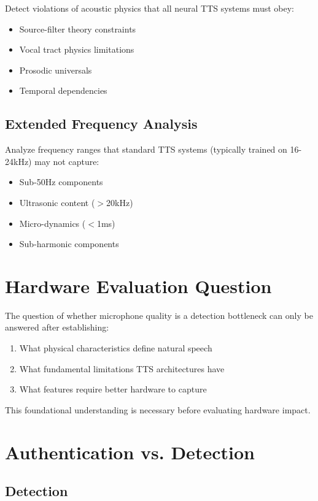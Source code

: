 \documentclass{article}
\begin{document}
Detect violations of acoustic physics that all neural TTS systems must obey:
\begin{itemize}
    \item Source-filter theory constraints
    \item Vocal tract physics limitations
    \item Prosodic universals
    \item Temporal dependencies
\end{itemize}

\subsection{Extended Frequency Analysis}

Analyze frequency ranges that standard TTS systems (typically trained on 16-24kHz) may not capture:
\begin{itemize}
    \item Sub-50Hz components
    \item Ultrasonic content ($>$20kHz)
    \item Micro-dynamics ($<$1ms)
    \item Sub-harmonic components
\end{itemize}

\section{Hardware Evaluation Question}

The question of whether microphone quality is a detection bottleneck can only be answered after establishing:
\begin{enumerate}
    \item What physical characteristics define natural speech
    \item What fundamental limitations TTS architectures have
    \item What features require better hardware to capture
\end{enumerate}

This foundational understanding is necessary before evaluating hardware impact.

\section{Authentication vs. Detection}

\subsection{Detection}
\end{document}
